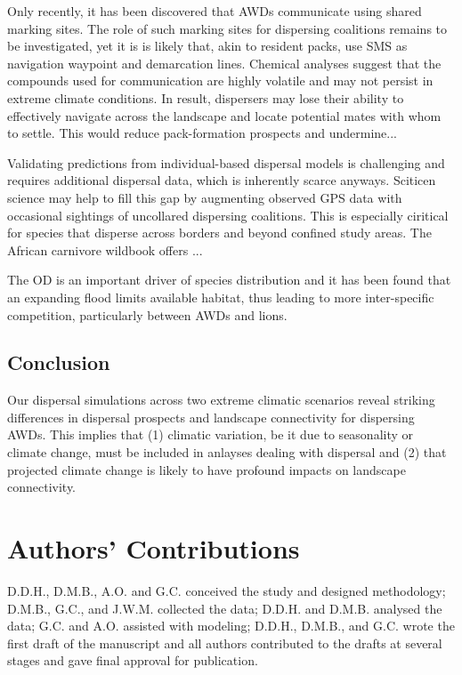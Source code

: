 \documentclass[abstract=on,10pt,a4paper,bibliography=totocnumbered]{article}
\begin{document}
Only recently, it has been discovered that AWDs communicate using shared marking
sites. The role of such marking sites for dispersing coalitions remains to be
investigated, yet it is is likely that, akin to resident packs, use SMS as
navigation waypoint and demarcation lines. Chemical analyses suggest that the
compounds used for communication are highly volatile and may not persist in
extreme climate conditions. In result, dispersers may lose their ability to
effectively navigate across the landscape and locate potential mates with whom
to settle. This would reduce pack-formation prospects and undermine...

Validating predictions from individual-based dispersal models is challenging and
requires additional dispersal data, which is inherently scarce anyways. Sciticen
science may help to fill this gap by augmenting observed GPS data with
occasional sightings of uncollared dispersing coalitions. This is especially
ciritical for species that disperse across borders and beyond confined study
areas. The African carnivore wildbook offers ...

The OD is an important driver of species distribution and it has been found that
an expanding flood limits available habitat, thus leading to more inter-specific
competition, particularly between AWDs and lions.

\subsection{Conclusion}
Our dispersal simulations across two extreme climatic scenarios reveal striking
differences in dispersal prospects and landscape connectivity for dispersing
AWDs. This implies that (1) climatic variation, be it due to seasonality or
climate change, must be included in anlayses dealing with dispersal and (2) that
projected climate change is likely to have profound impacts on landscape
connectivity.

\section{Authors' Contributions}
D.D.H., D.M.B., A.O. and G.C. conceived the study and designed methodology;
D.M.B., G.C., and J.W.M. collected the data; D.D.H. and D.M.B. analysed the
data; G.C. and A.O. assisted with modeling; D.D.H., D.M.B., and G.C. wrote the
first draft of the manuscript and all authors contributed to the drafts at
several stages and gave final approval for publication.
\end{document}
